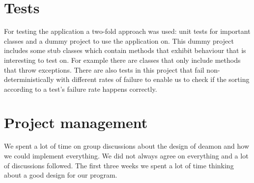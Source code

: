 \documentclass[i2]{oss}
\begin{document}



\section{Tests}
\label{ssec:tests}

For testing the application a two-fold approach was used: unit tests for
important classes and a dummy project to use the application on.
This dummy project includes some stub classes which contain methods that
exhibit behaviour that is interesting to test on.
For example there are classes that only include methods that throw 
exceptions.
There are also tests in this project that fail non-deterministically with 
different rates of failure to enable us to check if the sorting according 
to a test's failure rate happens correctly.



\section{Project management}
\label{ssec:Projectmanag}

We spent a lot of time on group discussions about the design of deamon and how we could implement everything. We did not always agree on everything and a lot of discussions followed. The first three weeks we spent a lot of time thinking about a good design for our program.\\ 
\end{document}
